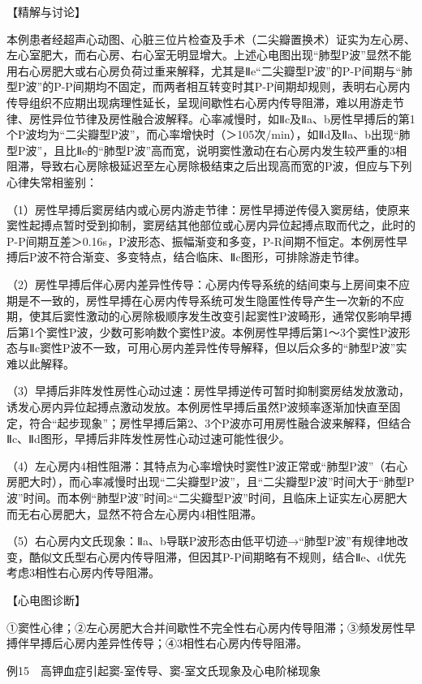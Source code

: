 【精解与讨论】

本例患者经超声心动图、心脏三位片检查及手术（二尖瓣置换术）证实为左心房、左心室肥大，而右心房、右心室无明显增大。上述心电图出现“肺型P波”显然不能用右心房肥大或右心房负荷过重来解释，尤其是Ⅱe“二尖瓣型P波”的P-P间期与“肺型P波”的P-P间期均不固定，而两者相互转变时其P-P间期却规则，表明右心房内传导组织不应期出现病理性延长，呈现间歇性右心房内传导阻滞，难以用游走节律、房性异位节律及房性融合波解释。心率减慢时，如Ⅱc及Ⅱa、b房性早搏后的第1个P波均为“二尖瓣型P波”，而心率增快时（＞105次/min），如Ⅱd及Ⅱa、b出现“肺型P波”，且比Ⅱe的“肺型P波”高而宽，说明窦性激动在右心房内发生较严重的3相阻滞，导致右心房除极延迟至左心房除极结束之后出现高而宽的P波，但应与下列心律失常相鉴别：

（1）房性早搏后窦房结内或心房内游走节律：房性早搏逆传侵入窦房结，使原来窦性起搏点暂时受到抑制，窦房结其他部位或心房内异位起搏点取而代之，此时的P-P间期互差＞0.16s，P波形态、振幅渐变和多变，P-R间期不恒定。本例房性早搏后P波不符合渐变、多变特点，结合临床、Ⅱc图形，可排除游走节律。

（2）房性早搏后伴心房内差异性传导：心房内传导系统的结间束与上房间束不应期是不一致的，房性早搏在心房内传导系统可发生隐匿性传导产生一次新的不应期，使其后窦性激动的心房除极顺序发生改变引起窦性P波畸形，通常仅影响早搏后第1个窦性P波，少数可影响数个窦性P波。本例房性早搏后第1～3个窦性P波形态与Ⅱc窦性P波不一致，可用心房内差异性传导解释，但以后众多的“肺型P波”实难以此解释。

（3）早搏后非阵发性房性心动过速：房性早搏逆传可暂时抑制窦房结发放激动，诱发心房内异位起搏点激动发放。本例房性早搏后虽然P波频率逐渐加快直至固定，符合“起步现象”；房性早搏后第2、3个P波亦可用房性融合波来解释，但结合Ⅱc、Ⅱd图形，早搏后非阵发性房性心动过速可能性很少。

（4）左心房内4相性阻滞：其特点为心率增快时窦性P波正常或“肺型P波”（右心房肥大时），而心率减慢时出现“二尖瓣型P波”，且“二尖瓣型P波”时间大于“肺型P波”时间。而本例“肺型P波”时间≥“二尖瓣型P波”时间，且临床上证实左心房肥大而无右心房肥大，显然不符合左心房内4相性阻滞。

（5）右心房内文氏现象：Ⅱa、b导联P波形态由低平切迹→“肺型P波”有规律地改变，酷似文氏型右心房内传导阻滞，但因其P-P间期略有不规则，结合Ⅱe、d优先考虑3相性右心房内传导阻滞。

【心电图诊断】

①窦性心律；②左心房肥大合并间歇性不完全性右心房内传导阻滞；③频发房性早搏伴早搏后心房内差异性传导；④3相性右心房内传导阻滞。

例15　高钾血症引起窦-室传导、窦-室文氏现象及心电阶梯现象

